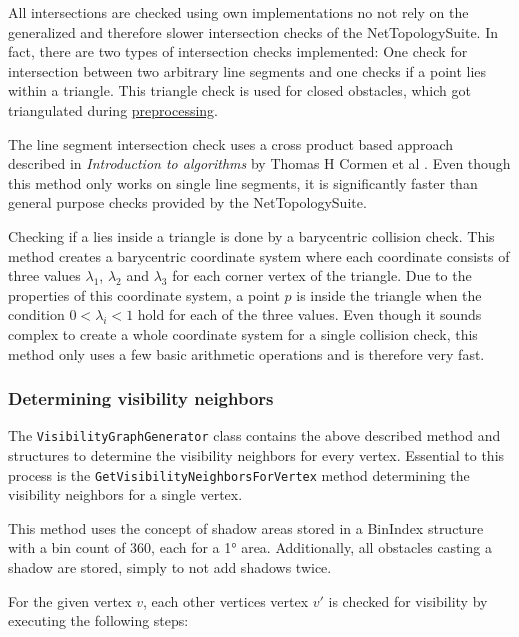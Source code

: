 				All intersections are checked using own implementations no not rely on the generalized and therefore slower intersection checks of the NetTopologySuite.
				In fact, there are two types of intersection checks implemented:
				One check for intersection between two arbitrary line segments and one checks if a point lies within a triangle.
				This triangle check is used for closed obstacles, which got triangulated during \hyperref[subsec:step-1-preprocessing]{preprocessing}.
				
				The line segment intersection check uses a cross product based approach described in \emph{Introduction to algorithms} by Thomas H Cormen et al \cite[1018]{cormen-introduction-to-alg}.
				Even though this method only works on single line segments, it is significantly faster than general purpose checks provided by the NetTopologySuite.
				
				Checking if a  lies inside a triangle is done by a barycentric collision check.
				This method creates a barycentric coordinate system where each coordinate consists of three values $\lambda_1$, $\lambda_2$ and $\lambda_3$ for each corner vertex of the triangle.
				Due to the properties of this coordinate system, a point $p$ is inside the triangle when the condition $0 < \lambda_i < 1$ hold for each of the three values.
				Even though it sounds complex to create a whole coordinate system for a single collision check, this method only uses a few basic arithmetic operations and is therefore very fast.
				
			\subsubsection{Determining visibility neighbors}
			
				The \texttt{VisibilityGraphGenerator} class contains the above described method and structures to determine the visibility neighbors for every vertex.
				Essential to this process is the \texttt{GetVisibilityNeighborsForVertex} method determining the visibility neighbors for a single vertex.
				
				This method uses the concept of shadow areas stored in a BinIndex structure with a bin count of 360, each for a 1° area.
				Additionally, all obstacles casting a shadow are stored, simply to not add shadows twice.
				
				For the given vertex $v$, each other vertices vertex $v'$ is checked for visibility by executing the following steps:
				
